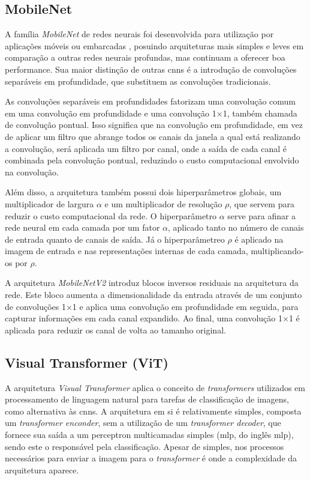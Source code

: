 \subsection{MobileNet}
A família \textit{MobileNet} de redes neurais foi desenvolvida para utilização por aplicações móveis ou embarcadas \cite{mobilenet}, 
posuindo arquiteturas mais simples e leves em comparação a outras redes neurais profundas, 
mas continuam a oferecer boa performance. Sua maior distinção de outras \acrshort{cnn}s é a introdução de convoluções separáveis em profundidade, que substituem as convoluções tradicionais.

As convoluções separáveis em profundidades fatorizam uma convolução comum em uma convolução em profundidade e uma convolução 1$\times$1, também chamada de convolução pontual. Isso significa que na convolução em profundidade, em vez de aplicar um filtro que abrange todos os canais da janela a qual está realizando a convolução, será aplicada um filtro por canal, onde a saída de cada canal é combinada pela convolução pontual, reduzindo o custo computacional envolvido na convolução.

Além disso, a arquitetura também possui dois hiperparâmetros globais, um multiplicador de largura $\alpha$ e um multiplicador de resolução $\rho$, que servem para reduzir o custo computacional da rede. O hiperparâmetro $\alpha$ serve para afinar a rede neural em cada camada por um fator $\alpha$, aplicado tanto no número de canais de entrada quanto de canais de saída. Já o hiperparâmetreo $\rho$ é aplicado na imagem de entrada e nas representações internas de cada camada, multiplicando-os por $\rho$.

A arquitetura \textit{MobileNetV2}\cite{mobilenetv2} introduz blocos inversos residuais na arquitetura da rede. Este bloco aumenta a dimensionalidade da entrada através de um conjunto de convoluções 1$\times$1 e aplica uma convolução em profundidade em seguida, para capturar informações em cada canal expandido. Ao final, uma convolução 1$\times$1 é aplicada para reduzir os canal de volta ao tamanho original.

\subsection{Visual Transformer (ViT)}
A arquitetura \textit{Visual Transformer}\cite{vit} aplica o conceito de \textit{transformers}\cite{transformer2017} 
utilizados em processamento de linguagem natural para tarefas de classificação de imagens, como alternativa às \acrshort{cnn}s. 
A arquitetura em si é relativamente simples, composta um \textit{transformer enconder}, sem a utilização de um \textit{transformer decoder}, 
que fornece sua saída a um perceptron multicamadas simples (\acrshort{mlp}, do inglês \acrlong{mlp}), sendo este o responsável pela classificação. 
Apesar de simples, nos processos necessários para enviar a imagem para o \textit{transformer} é onde a complexidade da arquitetura aparece.

